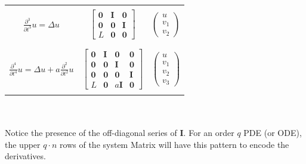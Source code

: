 {\begin{tabular}{c|c|c}
        \\\hline \hspace*{2mm} & \hspace*{2mm} 
        \\$\frac{\partial^3}{\partial t^3}u = \Delta u$ & 
        $\begin{bmatrix}
            \textbf{0} & \textbf{I} & \textbf{0}
            \\\textbf{0} & \textbf{0} & \textbf{I}
            \\ L & \textbf{0} & \textbf{0}
        \end{bmatrix}$ 
        & $\begin{pmatrix}
            u \\ v_1 \\ v_2
        \end{pmatrix}$
        \\ \hspace*{2mm} & \hspace*{2mm} 
        \\\hline \hspace*{2mm} & \hspace*{2mm} 
        \\$\frac{\partial^4}{\partial t^4}u = \Delta u + a\frac{\partial^2}{\partial t^2}u $ & 
        $\begin{bmatrix}
            \textbf{0} & \textbf{I} & \textbf{0} & \textbf{0}
            \\\textbf{0} & \textbf{0} & \textbf{I} & \textbf{0}
            \\ \textbf{0} & \textbf{0} & \textbf{0} & \textbf{I}
            \\ L & \textbf{0} & \!\!a\textbf{I} \!\!& \textbf{0}
        \end{bmatrix}$ \!
        & $\begin{pmatrix}
            u \\ v_1 \\ v_2 \\ v_3
        \end{pmatrix}$
        \\ \hspace*{2mm} & \hspace*{2mm} &  \hspace*{15mm} 
    \end{tabular}
    \\
    \\
    Notice the presence of the off-diagonal series of $\textbf{I}$. For an order $q$ PDE (or ODE), the upper $q\cdot n$ rows of the system Matrix will have this pattern to encode the derivatives.
}%
